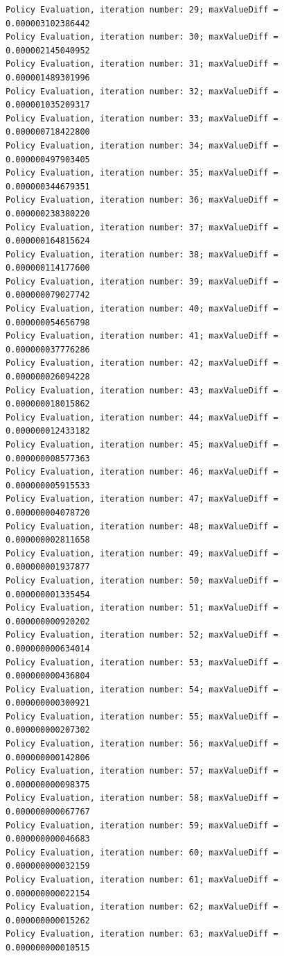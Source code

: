 \documentclass{article}
\begin{document}
\begin{scriptsize}
\begin{verbatim}
Policy Evaluation, iteration number: 29; maxValueDiff = 0.000003102386442 
Policy Evaluation, iteration number: 30; maxValueDiff = 0.000002145040952 
Policy Evaluation, iteration number: 31; maxValueDiff = 0.000001489301996 
Policy Evaluation, iteration number: 32; maxValueDiff = 0.000001035209317 
Policy Evaluation, iteration number: 33; maxValueDiff = 0.000000718422800 
Policy Evaluation, iteration number: 34; maxValueDiff = 0.000000497903405 
Policy Evaluation, iteration number: 35; maxValueDiff = 0.000000344679351 
Policy Evaluation, iteration number: 36; maxValueDiff = 0.000000238380220 
Policy Evaluation, iteration number: 37; maxValueDiff = 0.000000164815624 
Policy Evaluation, iteration number: 38; maxValueDiff = 0.000000114177600 
Policy Evaluation, iteration number: 39; maxValueDiff = 0.000000079027742 
Policy Evaluation, iteration number: 40; maxValueDiff = 0.000000054656798 
Policy Evaluation, iteration number: 41; maxValueDiff = 0.000000037776286 
Policy Evaluation, iteration number: 42; maxValueDiff = 0.000000026094228 
Policy Evaluation, iteration number: 43; maxValueDiff = 0.000000018015862 
Policy Evaluation, iteration number: 44; maxValueDiff = 0.000000012433182 
Policy Evaluation, iteration number: 45; maxValueDiff = 0.000000008577363 
Policy Evaluation, iteration number: 46; maxValueDiff = 0.000000005915533 
Policy Evaluation, iteration number: 47; maxValueDiff = 0.000000004078720 
Policy Evaluation, iteration number: 48; maxValueDiff = 0.000000002811658 
Policy Evaluation, iteration number: 49; maxValueDiff = 0.000000001937877 
Policy Evaluation, iteration number: 50; maxValueDiff = 0.000000001335454 
Policy Evaluation, iteration number: 51; maxValueDiff = 0.000000000920202 
Policy Evaluation, iteration number: 52; maxValueDiff = 0.000000000634014 
Policy Evaluation, iteration number: 53; maxValueDiff = 0.000000000436804 
Policy Evaluation, iteration number: 54; maxValueDiff = 0.000000000300921 
Policy Evaluation, iteration number: 55; maxValueDiff = 0.000000000207302 
Policy Evaluation, iteration number: 56; maxValueDiff = 0.000000000142806 
Policy Evaluation, iteration number: 57; maxValueDiff = 0.000000000098375 
Policy Evaluation, iteration number: 58; maxValueDiff = 0.000000000067767 
Policy Evaluation, iteration number: 59; maxValueDiff = 0.000000000046683 
Policy Evaluation, iteration number: 60; maxValueDiff = 0.000000000032159 
Policy Evaluation, iteration number: 61; maxValueDiff = 0.000000000022154 
Policy Evaluation, iteration number: 62; maxValueDiff = 0.000000000015262 
Policy Evaluation, iteration number: 63; maxValueDiff = 0.000000000010515 

\end{verbatim}
\end{scriptsize}
\end{document}
